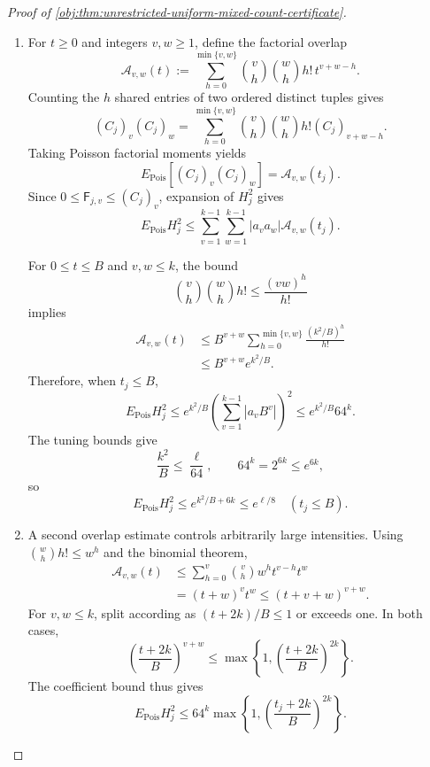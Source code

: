 \begin{proof}[Proof of \cref{obj:thm:unrestricted-uniform-mixed-count-certificate}]
\begin{enumerate}
\item For \(t\ge0\) and integers \(v,w\ge1\), define the factorial overlap
\[
\mathcal A_{v,w}(t)
:=
\sum_{h=0}^{\min\{v,w\}}
\binom vh\binom wh h!\,t^{v+w-h}.
\]
Counting the \(h\) shared entries of two ordered distinct tuples gives
\[
(C_j)_v(C_j)_w
=
\sum_{h=0}^{\min\{v,w\}}
\binom vh\binom wh h!(C_j)_{v+w-h}.
\]
Taking Poisson factorial moments yields
\[
E_{\mathrm{Pois}}[(C_j)_v(C_j)_w]
=\mathcal A_{v,w}(t_j).
\]
Since \(0\le\mathsf F_{j,v}\le(C_j)_v\), expansion of \(H_j^2\) gives
\[
E_{\mathrm{Pois}}H_j^2
\le
\sum_{v=1}^{k-1}\sum_{w=1}^{k-1}
|a_va_w|\mathcal A_{v,w}(t_j).
\]

For \(0\le t\le B\) and \(v,w\le k\), the bound
\[
\binom vh\binom wh h!\le\frac{(vw)^h}{h!}
\]
implies
\[
\begin{aligned}
\mathcal A_{v,w}(t)
&\le B^{v+w}
\sum_{h=0}^{\min\{v,w\}}
\frac{(k^2/B)^h}{h!}\\
&\le B^{v+w}e^{k^2/B}.
\end{aligned}
\]
Therefore, when \(t_j\le B\),
\[
E_{\mathrm{Pois}}H_j^2
\le e^{k^2/B}
\left(\sum_{v=1}^{k-1}|a_vB^v|\right)^2
\le e^{k^2/B}64^k.
\]
The tuning bounds give
\[
\frac{k^2}{B}\le\frac{\ell}{64},
\qquad 64^k=2^{6k}\le e^{6k},
\]
so
\[
E_{\mathrm{Pois}}H_j^2
\le e^{k^2/B+6k}\le e^{\ell/8}
\quad(t_j\le B).
\]

\item A second overlap estimate controls arbitrarily large intensities.
Using \(\binom whh!\le w^h\) and the binomial theorem,
\[
\begin{aligned}
\mathcal A_{v,w}(t)
&\le
\sum_{h=0}^{v}\binom vh w^h t^{v-h}t^w\\
&=(t+w)^vt^w
\le(t+v+w)^{v+w}.
\end{aligned}
\]
For \(v,w\le k\), split according as \((t+2k)/B\le1\) or exceeds one.
In both cases,
\[
\left(\frac{t+2k}{B}\right)^{v+w}
\le
\max\left\{1,\left(\frac{t+2k}{B}\right)^{2k}\right\}.
\]
The coefficient bound thus gives
\[
E_{\mathrm{Pois}}H_j^2
\le64^k
\max\left\{1,
\left(\frac{t_j+2k}{B}\right)^{2k}\right\}.
\]


\end{enumerate}
\end{proof}
